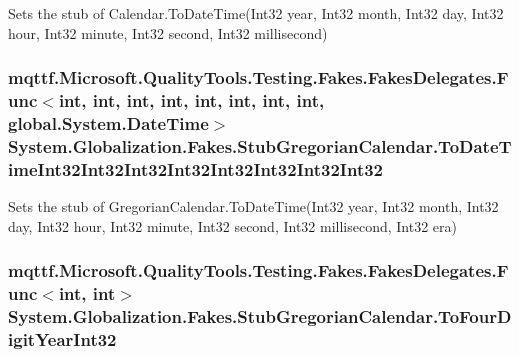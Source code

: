 Sets the stub of Calendar.\-To\-Date\-Time(\-Int32 year, Int32 month, Int32 day, Int32 hour, Int32 minute, Int32 second, Int32 millisecond)

\hypertarget{class_system_1_1_globalization_1_1_fakes_1_1_stub_gregorian_calendar_a8480a88d19262852ba782d7efa767594}{
\subsubsection[{To\-Date\-Time\-Int32\-Int32\-Int32\-Int32\-Int32\-Int32\-Int32\-Int32}]{\setlength{\rightskip}{0pt plus 5cm}mqttf.\-Microsoft.\-Quality\-Tools.\-Testing.\-Fakes.\-Fakes\-Delegates.\-Func$<$int, int, int, int, int, int, int, int, global.\-System.\-Date\-Time$>$ System.\-Globalization.\-Fakes.\-Stub\-Gregorian\-Calendar.\-To\-Date\-Time\-Int32\-Int32\-Int32\-Int32\-Int32\-Int32\-Int32\-Int32}}\label{class_system_1_1_globalization_1_1_fakes_1_1_stub_gregorian_calendar_a8480a88d19262852ba782d7efa767594}


Sets the stub of Gregorian\-Calendar.\-To\-Date\-Time(\-Int32 year, Int32 month, Int32 day, Int32 hour, Int32 minute, Int32 second, Int32 millisecond, Int32 era)

\hypertarget{class_system_1_1_globalization_1_1_fakes_1_1_stub_gregorian_calendar_a96a4a928dbcfb2b8dc8045848f0bd15c}{
\subsubsection[{To\-Four\-Digit\-Year\-Int32}]{\setlength{\rightskip}{0pt plus 5cm}mqttf.\-Microsoft.\-Quality\-Tools.\-Testing.\-Fakes.\-Fakes\-Delegates.\-Func$<$int, int$>$ System.\-Globalization.\-Fakes.\-Stub\-Gregorian\-Calendar.\-To\-Four\-Digit\-Year\-Int32}}\label{class_system_1_1_globalization_1_1_fakes_1_1_stub_gregorian_calendar_a96a4a928dbcfb2b8dc8045848f0bd15c}


